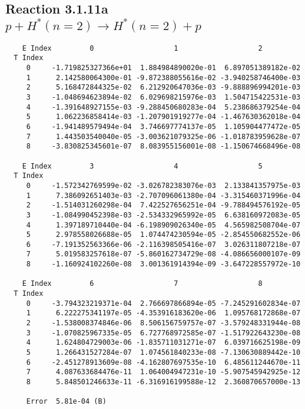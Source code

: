 \documentclass[12pt]{article}
\begin{document}
                               


\newpage
\subsection{
Reaction 3.1.11a $ p + H^*(n=2) \rightarrow H^*(n=2) + p$}


\begin{small}\begin{verbatim}
    E Index         0                   1                   2
  T Index
     0     -1.719825327366e+01  1.884984890020e-01  6.897051389182e-02
     1      2.142580064300e-01 -9.872388055616e-02 -3.940258746400e-03
     2      5.168472844325e-02  6.212920647036e-03 -9.888896994201e-03
     3     -1.048694623894e-02  6.029698215976e-03  1.504715422531e-03
     4     -1.391648927155e-03 -9.288450680283e-04  5.238686379254e-04
     5      1.062236858414e-03 -1.207901919277e-04 -1.467630362018e-04
     6     -1.941489579494e-04  3.746697774137e-05  1.105904477472e-05
     7      1.443503540040e-05 -3.003621079325e-06 -1.018783959628e-07
     8     -3.830825345601e-07  8.083955156001e-08 -1.150674668496e-08

    E Index         3                   4                   5
  T Index
     0     -1.572342769599e-02 -3.026782383076e-03  2.133841357975e-03
     1      7.386092651403e-03 -2.707096061380e-04 -3.315460371996e-04
     2     -1.514031260298e-04  7.422527656251e-04 -9.788494576192e-05
     3     -1.084990452398e-03 -2.534332965992e-05  6.638160972083e-05
     4      1.397189710440e-04 -6.198909026340e-05  4.565982508704e-07
     5      2.978558026688e-05  1.074474230594e-05 -2.854550682552e-06
     6     -7.191352563366e-06 -2.116398505416e-07  3.026311807218e-07
     7      5.019583257618e-07 -5.860162734729e-08 -4.086656000107e-09
     8     -1.160924102260e-08  3.001361914394e-09 -3.647228557972e-10

    E Index         6                   7                   8
  T Index
     0     -3.794323219371e-04  2.766697866894e-05 -7.245291602834e-07
     1      6.222275341197e-05 -4.353916183620e-06  1.095768172868e-07
     2     -1.538008374846e-06  8.506156759757e-07 -3.579248331944e-08
     3     -1.070825967335e-05  6.727768972585e-07 -1.517922643230e-08
     4      1.624804729003e-06 -1.835711031271e-07  6.039716625198e-09
     5      1.266431527284e-07  1.074561840233e-08 -7.130630889442e-10
     6     -2.451278913609e-08 -4.162807697535e-10  6.485611244670e-11
     7      4.087633684476e-11  1.064004947231e-10 -5.907545942925e-12
     8      5.848501246633e-11 -6.316916199588e-12  2.360870657000e-13

     Error  5.81e-04 (B)
\end{verbatim}\end{small}
\end{document}
